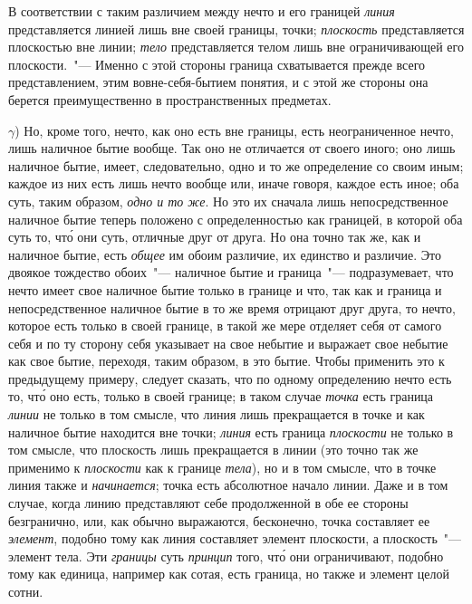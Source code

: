 В соответствии с таким различием между нечто и его
границей \emph{линия} представляется линией лишь вне своей
границы, точки; \emph{плоскость} представляется плоскостью
вне линии; \emph{тело} представляется телом лишь вне ограничивающей
его плоскости.~"--- Именно с этой стороны граница
схватывается прежде всего представлением, этим
вовне-себя-бытием понятия, и с этой же стороны она
берется преимущественно в пространственных предметах.

$\gamma$) Но, кроме того, нечто, как оно есть вне границы,
есть неограниченное нечто, лишь наличное бытие вообще.
Так оно не отличается от своего иного; оно лишь
наличное бытие, имеет, следовательно, одно и то же определение
со своим иным; каждое из них есть лишь нечто
вообще или, иначе говоря, каждое есть иное; оба суть,
таким образом, \emph{одно и то же}. Но это их сначала лишь
непосредственное наличное бытие теперь положено с
определенностью как границей, в которой оба суть то,
чт\'о они суть, отличные друг от друга. Но она точно так
же, как и наличное бытие, есть \emph{общее} им обоим различие,
их единство и различие. Это двоякое тождество
обоих~"--- наличное бытие и граница~"--- подразумевает, что
нечто имеет свое наличное бытие только в границе и
что, так как и граница и непосредственное наличное бытие
в то же время отрицают друг друга, то нечто, которое
есть только в своей границе, в такой же мере отделяет
себя от самого себя и по ту сторону себя указывает
на свое небытие и выражает свое небытие как свое бытие,
переходя, таким образом, в это бытие. Чтобы применить
это к предыдущему примеру, следует сказать, что по
одному определению нечто есть то, чт\'о оно есть, только
в своей границе; в таком случае \emph{точка} есть граница
\emph{линии} не только в том смысле, что линия лишь прекращается
в точке и как наличное бытие находится вне точки;
\emph{линия} есть граница \emph{плоскости} не только в том смысле,
что плоскость лишь прекращается в линии (это точно
так же применимо к \emph{плоскости} как к границе \emph{тела}),
но и в том смысле, что в точке линия также и \emph{начинается};
точка есть абсолютное начало линии. Даже и в том
случае, когда линию представляют себе продолженной
в обе ее стороны безгранично, или, как обычно выражаются,
бесконечно, точка составляет ее \emph{элемент}, подобно
тому как линия составляет элемент плоскости, а плоскость~"---
элемент тела. Эти \emph{границы} суть \emph{принцип} того,
чт\'о они ограничивают, подобно тому как единица, например
как сотая, есть граница, но также и элемент целой
сотни.

